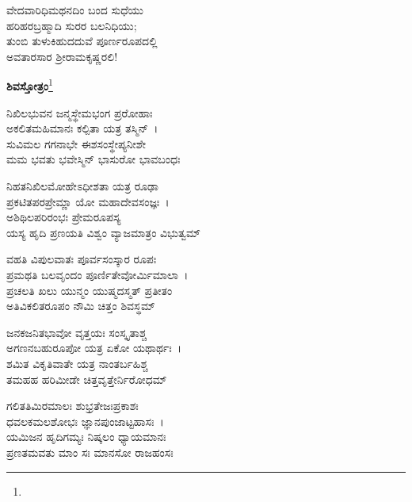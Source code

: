 \begin{myquote}
ವೇದವಾರಿಧಿಮಥನದಿಂ ಬಂದ ಸುಧೆಯು\\ಹರಿಹರಬ್ರಹ್ಮಾದಿ ಸುರರ ಬಲನಿಧಿಯು;\\ತುಂಬಿ ತುಳುಕಿಹುದದುವೆ ಪೂರ್ಣರೂಪದಲ್ಲಿ\\ಅವತಾರಸಾರ ಶ‍್ರೀರಾಮಕೃಷ್ಣರಲಿ!
\end{myquote}

\begin{center}
\textbf{ಶಿವಸ್ತೋತ್ರಂ}\footnote{}
\end{center}

\begin{myquote}
ನಿಖಿಲಭುವನ ಜನ್ಮಸ್ಥೇಮಭಂಗ ಪ್ರರೋಹಾಃ\\ಅಕಲಿತಮಹಿಮಾನಃ ಕಲ್ಪಿತಾ ಯತ್ರ ತಸ್ಮಿನ್~।\\ಸುವಿಮಲ ಗಗನಾಭೇ ಈಶಸಂಸ್ಥೇಪ್ಯನೀಶೇ\\ಮಮ ಭವತು ಭವೇಸ್ಮಿನ್ ಭಾಸುರೋ ಭಾವಬಂಧಃ
\end{myquote}


\begin{myquote}
ನಿಹತನಿಖಿಲಮೋಹೇಽಧೀಶತಾ ಯತ್ರ ರೂಢಾ\\ಪ್ರಕಟಿತಪರಪ್ರೇಮ್ಣಾ ಯೋ ಮಹಾದೇವಸಂಜ್ಞಃ~।\\ಅಶಿಥಿಲಪರಿರಂಭಃ ಪ್ರೇಮರೂಪಸ್ಯ\\ಯಸ್ಯ ಹೃದಿ ಪ್ರಣಯತಿ ವಿಶ್ವಂ ವ್ಯಾಜಮಾತ್ರಂ ವಿಭುತ್ವಮ್
\end{myquote}


\begin{myquote}
ವಹತಿ ವಿಪುಲವಾತಃ ಪೂರ್ವಸಂಸ್ಕಾರ ರೂಪಃ\\ಪ್ರಮಥತಿ ಬಲವೃಂದಂ ಪೂರ್ಣಿತೇವೋರ್ಮಿಮಾಲಾ~।\\ಪ್ರಚಲತಿ ಖಲು ಯುನ್ಮಂ ಯುಷ್ಮದಸ್ಮತ್ ಪ್ರತೀತಂ\\ಅತಿವಿಕಲಿತರೂಪಂ ನೌಮಿ ಚಿತ್ತಂ ಶಿವಸ್ಥಮ್
\end{myquote}


\begin{myquote}
ಜನಕಜನಿತಭಾವೋ ವೃತ್ತಯಃ ಸಂಸ್ಕೃತಾಶ್ಚ\\ಅಗಣನಬಹುರೂಪೋ ಯತ್ರ ಏಕೋ ಯಥಾರ್ಥಃ~।\\ಶಮಿತ ವಿಕೃತಿವಾತೇ ಯತ್ರ ನಾಂತರ್ಬಹಿಶ್ಚ\\ತಮಹಹ ಹರಿಮೀಡೇ ಚಿತ್ತವೃತ್ತೇರ್ನಿರೋಧಮ್
\end{myquote}


\begin{myquote}
ಗಲಿತತಿಮಿರಮಾಲಃ ಶುಭ್ರತೇಜಃಪ್ರಕಾಶಃ\\ಧವಲಕಮಲಶೋಭಃ ಜ್ಞಾನಪುಂಜಾಟ್ಟಹಾಸಃ~।\\ಯಮಿಜನ ಹೃದಿಗಮ್ಯಃ ನಿಷ್ಕಲಂ ಧ್ಯಾಯಮಾನಃ\\ಪ್ರಣತಮವತು ಮಾಂ ಸಃ ಮಾನಸೋ ರಾಜಹಂಸಃ
\end{myquote}


